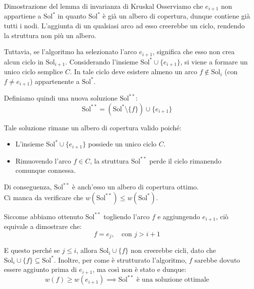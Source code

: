 \documentclass[12pt]{report}
\begin{document}
\begin{dimostrazione}{Dimostrazione del lemma di invarianza di Kruskal}{}
		Osserviamo che $e_{i+1}$ non appartiene a $\text{Sol}^*$ in quanto $\text{Sol}^*$ è già un albero di copertura, dunque contiene già tutti i nodi. L'aggiunta di un qualsiasi arco ad esso creerebbe un ciclo, rendendo la struttura non più un albero.
		
		Tuttavia, se l'algoritmo ha selezionato l'arco $e_{i+1}$, significa che esso non crea alcun ciclo in $\text{Sol}_{i+1}$. Considerando l'insieme $\text{Sol}^* \cup \{e_{i+1}\}$, si viene a formare un unico ciclo semplice $C$. In tale ciclo deve esistere almeno un arco $f \notin \text{Sol}_i$ (con $f \neq e_{i+1}$) appartenente a $\text{Sol}^*$.
		
		Definiamo quindi una nuova soluzione $\text{Sol}^{**}$:
		\[
		\text{Sol}^{**} = (\text{Sol}^* \setminus \{f\}) \cup \{e_{i+1}\}
		\]
		
		Tale soluzione rimane un albero di copertura valido poiché:
		\begin{itemize}
			\item L'insieme $\text{Sol}^* \cup \{e_{i+1}\}$ possiede un unico ciclo $C$.
			\item Rimuovendo l'arco $f \in C$, la struttura $\text{Sol}^{**}$ perde il ciclo rimanendo comunque connessa.
		\end{itemize}
		Di conseguenza, $\text{Sol}^{**}$ è anch'esso un albero di copertura ottimo.\\
		
		Ci manca da verificare che $w(\text{Sol}^{**}) \le w(\text{Sol}^*)$.
		
		Siccome abbiamo ottenuto $\text{Sol}^{**}$ togliendo l'arco $f$ e aggiungendo $e_{i+1}$, ciò equivale a dimostrare che:
		\[
		f = e_j, \quad \text{con } j > i+1
		\]
		
		E questo perché se $j \le i$, allora $\text{Sol}_i \cup \{f\}$ non creerebbe cicli, dato che $\text{Sol}_i \cup \{f\} \subseteq \text{Sol}^*$. Inoltre, per come è strutturato l'algoritmo, $f$ sarebbe dovuto essere aggiunto prima di $e_{i+1}$, ma così non è stato e dunque:
		\[
		w(f) \ge w(e_{i+1}) \implies \text{Sol}^{**} \text{ è una soluzione ottimale}
		\]
	\end{dimostrazione}
	
\end{document}
